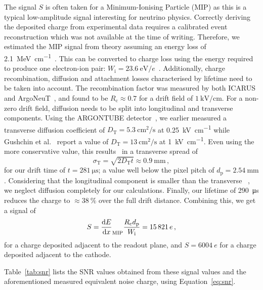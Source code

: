 \documentclass[instruments,article,submit,moreauthors,pdftex]{Definitions/mdpi}
\newcommand*{\m}{\mathrm}
\begin{document}
The signal $S$ is often taken for a Minimum-Ionising Particle (MIP) as this is a typical low-amplitude signal interesting for neutrino physics.
Correctly deriving the deposited charge from experimental data requires a calibrated event reconstruction which was not available at the time of writing.
Therefore, we estimated the MIP signal from theory assuming an energy loss of \SI{2.1}{\mega\electronvolt\per\centi\metre}~\cite{pdg}.
This can be converted to charge loss using the energy required to produce one electron-ion pair: $W_{\m{i}} = \SI{23.6}{\electronvolt\per\elementarycharge}$~\cite{NobleGasDetectors}.
Additionally, charge recombination, diffusion and attachment losses characterised by lifetime need to be taken into account.
The recombination factor was measured by both ICARUS and ArgoNeuT~\cite{icarusReco, argoneutReco}, and found to be $R_{\m{c}} \approx 0.7$ for a drift field of $\SI{1}{\kilo\volt\per\centi\meter}$.
For a non-zero drift field, diffusion needs to be split into longitudinal and transverse components.
Using the ARGONTUBE detector~\cite{argontube}, we earlier measured a transverse diffusion coefficient of $D_{\m{T}} = \SI{5.3}{\centi\metre\squared\per\second}$ at \SI{0.25}{\kilo\volt\per\centi\metre} while Gushchin et al.~\cite{gushchin} report a value of $D_{\m{T}} = \SI{13}{\centi\metre\squared\per\second}$ at \SI{1}{\kilo\volt\per\centi\metre}.
Even using the more conservative value, this results~\cite{lngDet} in a transverse spread of
\begin{equation}
\sigma_{\m{T}} = \sqrt{2 D_{\m{T}} t} \approx \SI{0.9}{\milli\metre}\,, 
\end{equation}
for our drift time of $t = \SI{281}{\micro\second}$; a value well below the pixel pitch of $d_{\m{p}} = \SI{2.54}{\milli\metre}$.
Considering that the longitudinal component is smaller than the transverse ~\cite{lngDet}, we neglect diffusion completely for our calculations.
Finally, our lifetime of \SI{290}{\micro\second} reduces the charge to $\approx\SI{38}{\percent}$ over the full drift distance.
Combining this, we get a signal of 
\begin{equation}
S = \dv{E}{x}_{\m{MIP}} \frac{R_{\m{c}} d_{\m{p}}}{W_{\m{i}}} = \SI{15821}{\elementarycharge}\,,
\end{equation}
for a charge deposited adjacent to the readout plane, and $S = \SI{6004}{\elementarycharge}$ for a charge deposited adjacent to the cathode.

Table~\ref{tab:snr} lists the SNR values obtained from these signal values and the aforementioned measured equivalent noise charge, using Equation~\eqref{eq:snr}.
\end{document}
